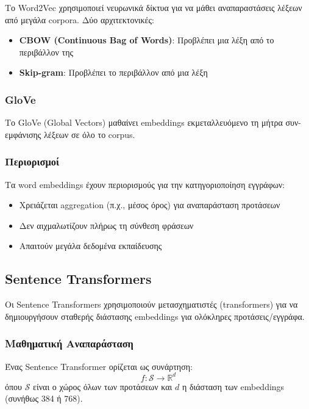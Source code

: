 \documentclass[12pt,a4paper,twoside]{book}
\begin{document}
Το Word2Vec χρησιμοποιεί νευρωνικά δίκτυα για να μάθει αναπαραστάσεις λέξεων από μεγάλα corpora. Δύο αρχιτεκτονικές:
\begin{itemize}
    \item \textbf{CBOW (Continuous Bag of Words)}: Προβλέπει μια λέξη από το περιβάλλον της
    \item \textbf{Skip-gram}: Προβλέπει το περιβάλλον από μια λέξη
\end{itemize}

\subsubsection{GloVe}

Το GloVe (Global Vectors) μαθαίνει embeddings εκμεταλλευόμενο τη μήτρα συν-εμφάνισης λέξεων σε όλο το corpus.

\subsubsection{Περιορισμοί}

Τα word embeddings έχουν περιορισμούς για την κατηγοριοποίηση εγγράφων:
\begin{itemize}
    \item Χρειάζεται aggregation (π.χ., μέσος όρος) για αναπαράσταση προτάσεων
    \item Δεν αιχμαλωτίζουν πλήρως τη σύνθεση φράσεων
    \item Απαιτούν μεγάλα δεδομένα εκπαίδευσης
\end{itemize}

\subsection{Sentence Transformers}

Οι Sentence Transformers χρησιμοποιούν μετασχηματιστές (transformers) για να δημιουργήσουν σταθερής διάστασης embeddings για ολόκληρες προτάσεις/εγγράφα.

\subsubsection{Μαθηματική Αναπαράσταση}

Ένας Sentence Transformer ορίζεται ως συνάρτηση:
\begin{equation}
    f: \mathcal{S} \rightarrow \mathbb{R}^d
\end{equation}
όπου \(\mathcal{S}\) είναι ο χώρος όλων των προτάσεων και \(d\) η διάσταση των embeddings (συνήθως 384 ή 768).
\end{document}
